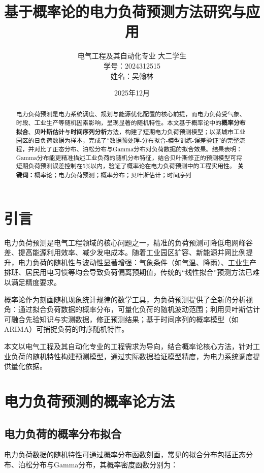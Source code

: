 \documentclass[12pt,a4paper]{article}
\begin{document}
\title{基于概率论的电力负荷预测方法研究与应用}
\author{电气工程及其自动化专业 大二学生\\学号：2024312515\\姓名：吴翰林}
\date{2025年12月}
\maketitle

\begin{abstract}
电力负荷预测是电力系统调度、规划与能源优化配置的核心前提，而电力负荷受气象、时段、工业生产等随机因素影响，呈现显著的随机特性。本文基于概率论中的\textbf{概率分布拟合}、\textbf{贝叶斯估计}与\textbf{时间序列分析}方法，构建了短期电力负荷预测模型；以某城市工业园区的日负荷数据为样本，完成了“数据预处理-分布拟合-模型训练-误差验证”的完整流程，并对比了正态分布、泊松分布与Gamma分布对负荷数据的拟合效果。结果表明：Gamma分布能更精准描述工业负荷的随机分布特征，结合贝叶斯修正的预测模型可将短期负荷预测误差控制在5\%以内，验证了概率论在电力负荷预测中的工程实用性。
\textbf{关键词：}概率论；电力负荷预测；概率分布；贝叶斯估计；时间序列
\end{abstract}

\section{引言}
电力负荷预测是电气工程领域的核心问题之一，精准的负荷预测可降低电网峰谷差、提高能源利用效率、减少发电成本\cite{load_forecast}。随着工业园区扩容、新能源并网比例提升，电力负荷的随机性与波动性显著增强：气象条件（如气温、降雨）、工业生产排班、居民用电习惯等均会导致负荷偏离预期值，传统的“线性拟合”预测方法已难以满足精度要求。

概率论作为刻画随机现象统计规律的数学工具，为负荷预测提供了全新的分析视角：通过拟合负荷数据的概率分布，可量化负荷的随机波动范围；利用贝叶斯估计可融合先验知识与实测数据，修正预测结果；基于时间序列的概率模型（如ARIMA）可捕捉负荷的时序随机特性。

本文以电气工程及其自动化专业的工程需求为导向，结合概率论核心方法，针对工业负荷的随机特性构建预测模型，通过实际数据验证模型精度，为电力系统调度提供量化依据。

\section{电力负荷预测的概率论方法}
\subsection{电力负荷的概率分布拟合}
电力负荷数据的随机特性可通过概率分布函数刻画，常见的拟合分布包括正态分布、泊松分布与Gamma分布，其概率密度函数分别为：
\end{document}
